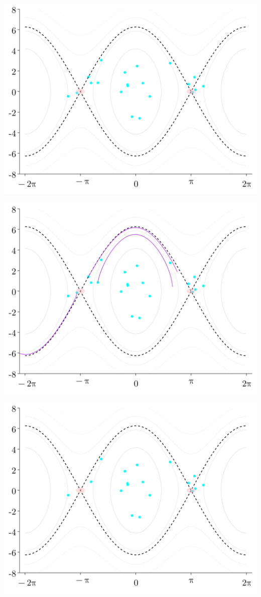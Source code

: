 \documentclass[
]{report}
\begin{document}
\includegraphics{contents/assets/neuralpbc/019.svg}

\includegraphics{contents/assets/neuralpbc/020.svg}

\includegraphics{contents/assets/neuralpbc/021.svg}
\end{document}
